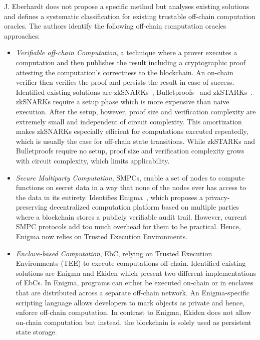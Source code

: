 \documentclass[final,3p,12pt,twocolumn]{elsarticle}
\begin{document}
J. Eberhardt \cite{Eberhardt2018} does not propose a specific method but analyses existing solutions and defines a systematic classification for existing trustable off-chain computation oracles. The authors identify the following off-chain computation oracles approaches:

\begin{itemize}
  \item \textit{Verifiable off-chain Computation}, a technique where a prover executes a computation and then publishes the result including a cryptographic proof attesting the computation’s correctness to the blockchain. An on-chain verifier then verifies the proof and persists the result in case of success. Identified existing solutions are zkSNARKs~\cite{Ben-SassonTechnionAlessandroChiesa2019}, Bulletproofs~\cite{Bunz2018} and zkSTARKs~\cite{Ben-Sasson2018}. zkSNARKs require a setup phase which is more expensive than naive execution. After the setup, however, proof size and verification complexity are extremely small and independent of circuit complexity. This amortization makes zkSNARKs especially efficient for computations executed repeatedly, which is usually the case for off-chain state transitions. While zkSTARKs and Bulletproofs require no setup, proof size and verification complexity grows with circuit complexity, which limits applicability.
  \item \textit{Secure Multiparty Computation}, SMPCs, enable a set of nodes to compute functions on secret data in a way that none of the nodes ever has access to the data in its entirety. Identifies Enigma~\cite{Tam2018}, which proposes a privacy-preserving decentralized computation platform based on multiple parties where a blockchain stores a publicly verifiable audit trail. However, current SMPC protocols add too much overhead for them to be practical. Hence, Enigma now relies on Trusted Execution Environments.
  \item \textit{Enclave-based Computation}, EbC, relying on Trusted Execution Environments (TEE) to execute computations off-chain. Identified existing solutions are Enigma and Ekiden \cite{Cheng2018} which present two different implementations of EbCs. In Enigma, programs can either be executed on-chain or in enclaves that are distributed across a separate off-chain network. An Enigma-specific scripting language allows developers to mark objects as private and hence, enforce off-chain computation. In contrast to Enigma, Ekiden does not allow on-chain computation but instead, the blockchain is solely used as persistent state storage.

\end{itemize}
\end{document}
